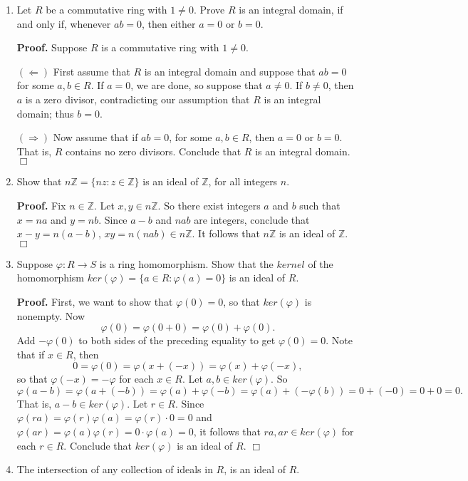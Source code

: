 \documentclass[9pt]{article}
\newcommand{\qed}{\hfill \ensuremath{\Box}}
\newcommand{\Z}{\mathbb{Z}}
\begin{document}
\begin{enumerate}
   \item Let $R$ be a commutative ring with $1 \neq 0$. Prove $R$ is an integral
         domain, if and only if, whenever $ab = 0$, then either $a = 0$ or
         $b = 0$.
         
      \textbf{Proof.} Suppose $R$ is a commutative ring with $1 \neq 0$.
      
      $(\Leftarrow)$ First assume that $R$ is an integral domain and suppose that
      $ab = 0$ for some $a, b \in R$. If $a = 0$, we are done, so suppose that
      $a \neq 0$. If $b \neq 0$, then $a$ is a zero divisor, contradicting our
      assumption that $R$ is an integral domain; thus $b = 0$.
      
      $(\Rightarrow)$ Now assume that if $ab = 0$, for some $a, b \in R$, then
      $a = 0$ or $b = 0$. That is, $R$ contains no zero divisors. Conclude that
      $R$ is an integral domain. \qed
   \item Show that $n\Z = \{nz : z \in \Z\}$ is an ideal of $\Z$, for all
         integers $n$.
         
      \textbf{Proof.} Fix $n \in \Z$. Let $x, y \in n\Z$. So there exist
      integers $a$ and $b$ such that $x = na$ and $y = nb$. Since
      $a - b$ and $nab$ are integers, conclude that $x - y = n(a - b)$, 
      $xy = n(nab) \in n\Z$. It follows that $n\Z$ is an ideal of $\Z$. \qed
   \item Suppose $\varphi : R \rightarrow S$ is a ring homomorphism. Show that
         the $\textit{kernel}$ of the homomorphism
         $ker(\varphi) = \{a \in R : \varphi(a) = 0\}$ is an ideal of $R$.
         
      \textbf{Proof.} First, we want to show that $\varphi(0) = 0$, so that
      $ker(\varphi)$ is nonempty. Now
      $$\varphi(0) = \varphi(0 + 0) = \varphi(0) + \varphi(0).$$
      Add $-\varphi(0)$ to both sides of the preceding equality to get
      $\varphi(0) = 0$. Note that if $x \in R$, then
      $$0 = \varphi(0) = \varphi(x + (-x)) = \varphi(x) + \varphi(-x),$$
      so that $\varphi(-x) = -\varphi$ for each $x \in R$.
      Let $a, b \in ker(\varphi)$. So
      $$\varphi(a - b) = \varphi(a + (-b)) = \varphi(a) + \varphi(-b) =
      \varphi(a) + (-\varphi(b)) = 0 + (-0) = 0  + 0 = 0.$$
      That is, $a - b \in ker(\varphi)$. Let $r \in R$. Since
      $\varphi(ra) = \varphi(r)\varphi(a) = \varphi(r)\cdot 0 = 0$ and
      $\varphi(ar) = \varphi(a)\varphi(r) = 0 \cdot\varphi(a) = 0$, it follows
      that $ra, ar \in ker(\varphi)$ for each $r \in R$. Conclude that
      $ker(\varphi)$ is an ideal of $R$. \qed
   \item The intersection of any collection of ideals in $R$, is an ideal of
         $R$.
         

\end{enumerate}
\end{document}
